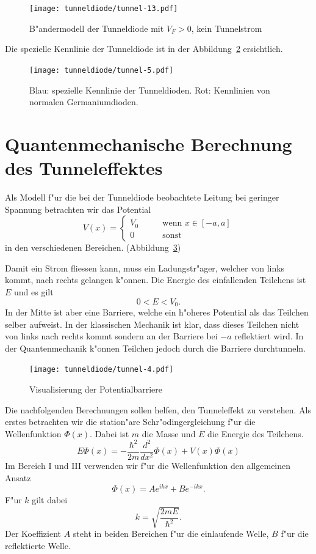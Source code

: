\begin{refsection}
\begin{figure}
\centering
\texttt{[image: tunneldiode/tunnel-13.pdf]}
\caption{B"andermodell der Tunneldiode mit $V_F > 0$, kein Tunnelstrom
\label{tunnel:Baendermodellmin}}
\end{figure}

Die spezielle Kennlinie der Tunneldiode ist in der Abbildung~\ref{tunnel:Tunneldiode} ersichtlich.

\begin{figure}	%
\centering
\texttt{[image: tunneldiode/tunnel-5.pdf]}
\caption{Blau: spezielle Kennlinie der Tunneldioden. Rot: Kennlinien von normalen Germaniumdioden.
\label{tunnel:Tunneldiode}}
\end{figure}

\section{Quantenmechanische Berechnung des Tunneleffektes}
\label{tunnel:tunneleffekt}
Als Modell f"ur die bei der Tunneldiode beobachtete Leitung bei geringer Spannung betrachten wir das Potential
\[
V(x)=\begin{cases}
V_0& \qquad \text{wenn } x \in [-a,a]\\
0&   \qquad \text{sonst}
\end{cases}
\]
in den verschiedenen Bereichen. (Abbildung~\ref{tunnel:Potentialbarriere})

Damit ein Strom fliessen kann, muss ein Ladungstr"ager, welcher von links kommt, nach rechts gelangen k"onnen. 
Die Energie des einfallenden Teilchens ist $E$ und es gilt
\[
0 < E < V_0.
\]
In der Mitte ist aber eine Barriere, welche ein h"oheres Potential als das Teilchen selber aufweist. 
In der klassischen Mechanik ist klar, dass dieses Teilchen nicht von links nach rechts kommt sondern an der Barriere bei $-a$ reflektiert wird. 
In der Quantenmechanik k"onnen Teilchen jedoch durch die Barriere durchtunneln.

\begin{figure}	%
\centering
\texttt{[image: tunneldiode/tunnel-4.pdf]}
\caption{Visualisierung der Potentialbarriere
\label{tunnel:Potentialbarriere}}
\end{figure}

Die nachfolgenden Berechnungen sollen helfen, den Tunneleffekt zu verstehen.  
Als erstes betrachten wir die station"are Schr"odingergleichung f"ur die Wellenfunktion $\Phi(x)$. 
Dabei ist $m$ die Masse und $E$ die Energie des Teilchens.
\[
E\Phi(x) = -\frac{\hbar^2}{2m}\frac{d^2}{dx^2}\Phi(x) + V(x)\Phi(x)
\]
Im Bereich \textrm{I} und \textrm{III} verwenden wir f"ur die Wellenfunktion den allgemeinen Ansatz
\[
\Phi(x) = Ae^{ikx}+Be^{-ikx}.
\]
F"ur $k$ gilt dabei
\[
k = \sqrt{\frac{2mE}{\hbar^2}}.
\]
Der Koeffizient $A$ steht in beiden Bereichen f"ur die einlaufende Welle, $B$ f"ur die reflektierte Welle.


\end{refsection}

